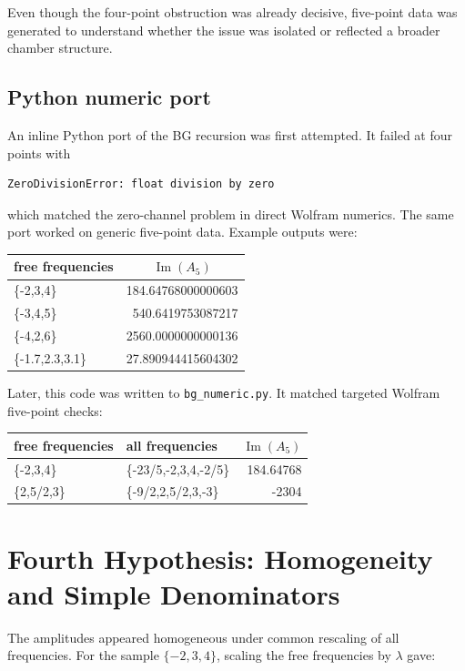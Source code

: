 \documentclass[11pt]{article}
\newcommand{\code}[1]{\texttt{#1}}
\begin{document}
Even though the four-point obstruction was already decisive, five-point data
was generated to understand whether the issue was isolated or reflected a
broader chamber structure.

\subsection*{Python numeric port}

An inline Python port of the BG recursion was first attempted.  It failed at
four points with

\begin{Verbatim}[fontsize=\small]
ZeroDivisionError: float division by zero
\end{Verbatim}

which matched the zero-channel problem in direct Wolfram numerics.  The same
port worked on generic five-point data.  Example outputs were:

\begin{center}
\begin{tabular}{>{\ttfamily}l r}
free frequencies & \multicolumn{1}{c}{\(\operatorname{Im}(A_5)\)}\\
\hline
\{-2,3,4\} & 184.64768000000603\\
\{-3,4,5\} & 540.6419753087217\\
\{-4,2,6\} & 2560.0000000000136\\
\{-1.7,2.3,3.1\} & 27.890944415604302
\end{tabular}
\end{center}

Later, this code was written to \code{bg\_numeric.py}.  It matched targeted
Wolfram five-point checks:

\begin{center}
\begin{tabular}{>{\ttfamily}l >{\ttfamily}l r}
free frequencies & all frequencies & \multicolumn{1}{c}{\(\operatorname{Im}(A_5)\)}\\
\hline
\{-2,3,4\} & \{-23/5,-2,3,4,-2/5\} & 184.64768\\
\{2,5/2,3\} & \{-9/2,2,5/2,3,-3\} & -2304
\end{tabular}
\end{center}

\section{Fourth Hypothesis: Homogeneity and Simple Denominators}

The amplitudes appeared homogeneous under common rescaling of all
frequencies.  For the sample \(\{-2,3,4\}\), scaling the free frequencies by
\(\lambda\) gave:
\end{document}
